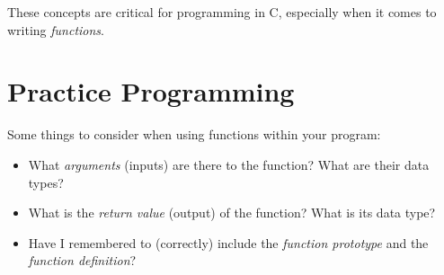 \documentclass{pass}
\begin{document}
These concepts are critical for programming in C, especially when it comes to writing \textit{functions}.

\pagebreak

\section*{Practice Programming}
Some things to consider when using functions within your program:
\begin{itemize}
\item What \textit{arguments} (inputs) are there to the function? What are their data types?
\item What is the \textit{return value} (output) of the function? What is its data type?
\item Have I remembered to (correctly) include the \textit{function prototype} and the \textit{function definition}? \\[12pt]
\end{itemize}

\end{document}
